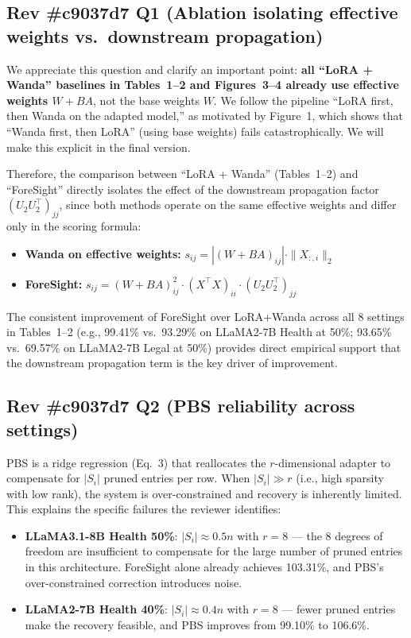 \documentclass{article}
\begin{document}
\subsection*{Rev \#c9037d7 Q1 (Ablation isolating effective weights vs.\ downstream propagation)}

We appreciate this question and clarify an important point: \textbf{all ``LoRA + Wanda'' baselines in Tables~1--2 and Figures~3--4 already use effective weights $W + BA$}, not the base weights $W$. We follow the pipeline ``LoRA first, then Wanda on the adapted model,'' as motivated by Figure~1, which shows that ``Wanda first, then LoRA'' (using base weights) fails catastrophically. We will make this explicit in the final version.

Therefore, the comparison between ``LoRA + Wanda'' (Tables~1--2) and ``ForeSight'' directly isolates the effect of the downstream propagation factor $(U_2 U_2^\top)_{jj}$, since both methods operate on the same effective weights and differ only in the scoring formula:
\begin{itemize}
    \item \textbf{Wanda on effective weights:} $s_{ij} = |{(W{+}BA)}_{ij}| \cdot \|X_{:,i}\|_2$
    \item \textbf{ForeSight:} $s_{ij} = {(W{+}BA)}_{ij}^2 \cdot (X^\top X)_{ii} \cdot (U_2 U_2^\top)_{jj}$
\end{itemize}
The consistent improvement of ForeSight over LoRA+Wanda across all 8 settings in Tables~1--2 (e.g., 99.41\% vs.\ 93.29\% on LLaMA2-7B Health at 50\%; 93.65\% vs.\ 69.57\% on LLaMA2-7B Legal at 50\%) provides direct empirical support that the downstream propagation term is the key driver of improvement.

\subsection*{Rev \#c9037d7 Q2 (PBS reliability across settings)}

PBS is a ridge regression (Eq.~3) that reallocates the $r$-dimensional adapter to compensate for $|S_i|$ pruned entries per row. When $|S_i| \gg r$ (i.e., high sparsity with low rank), the system is over-constrained and recovery is inherently limited. This explains the specific failures the reviewer identifies:

\begin{itemize}
    \item \textbf{LLaMA3.1-8B Health 50\%}: $|S_i| \approx 0.5n$ with $r=8$ --- the 8 degrees of freedom are insufficient to compensate for the large number of pruned entries in this architecture. ForeSight alone already achieves 103.31\%, and PBS's over-constrained correction introduces noise.
    \item \textbf{LLaMA2-7B Health 40\%}: $|S_i| \approx 0.4n$ with $r=8$ --- fewer pruned entries make the recovery feasible, and PBS improves from 99.10\% to 106.6\%.
\end{itemize}
\end{document}
